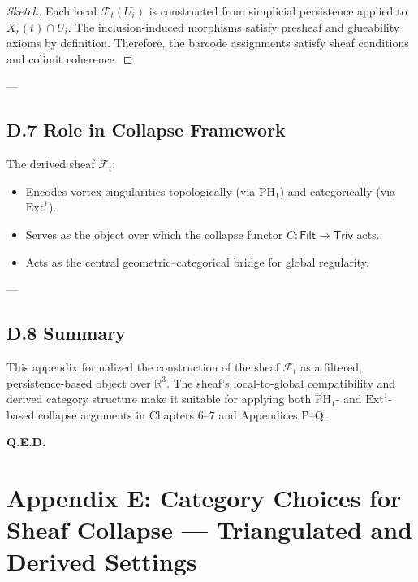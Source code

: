 \documentclass[11pt]{article}
\begin{document}
\begin{proof}[Sketch]
Each local \( \mathcal{F}_t(U_i) \) is constructed from simplicial persistence applied to \( X_r(t) \cap U_i \).  
The inclusion-induced morphisms satisfy presheaf and glueability axioms by definition.  
Therefore, the barcode assignments satisfy sheaf conditions and colimit coherence.
\end{proof}

---

\subsection*{D.7 Role in Collapse Framework}

The derived sheaf \( \mathcal{F}_t \):

\begin{itemize}
  \item Encodes vortex singularities topologically (via \( \mathrm{PH}_1 \)) and categorically (via \( \mathrm{Ext}^1 \)).
  \item Serves as the object over which the collapse functor \( C: \mathsf{Filt} \to \mathsf{Triv} \) acts.
  \item Acts as the central geometric–categorical bridge for global regularity.
\end{itemize}

---

\subsection*{D.8 Summary}

This appendix formalized the construction of the sheaf \( \mathcal{F}_t \) as a filtered,  
persistence-based object over \( \mathbb{R}^3 \).  
The sheaf's local-to-global compatibility and derived category structure make it suitable  
for applying both \( \mathrm{PH}_1 \)- and \( \mathrm{Ext}^1 \)-based collapse arguments  
in Chapters 6–7 and Appendices P–Q.

\begin{flushright}
\textbf{Q.E.D.}
\end{flushright}




\section*{Appendix E: Category Choices for Sheaf Collapse — Triangulated and Derived Settings}
\end{document}
